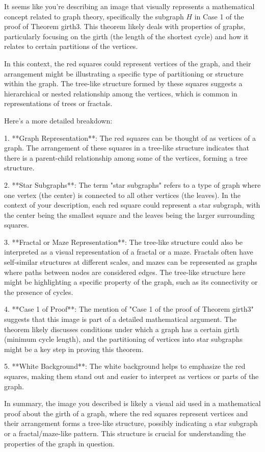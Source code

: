 It seems like you're describing an image that visually represents a mathematical concept related to graph theory, specifically the subgraph \(H\) in Case 1 of the proof of Theorem girth3. This theorem likely deals with properties of graphs, particularly focusing on the girth (the length of the shortest cycle) and how it relates to certain partitions of the vertices.

In this context, the red squares could represent vertices of the graph, and their arrangement might be illustrating a specific type of partitioning or structure within the graph. The tree-like structure formed by these squares suggests a hierarchical or nested relationship among the vertices, which is common in representations of trees or fractals.

Here's a more detailed breakdown:

1. **Graph Representation**: The red squares can be thought of as vertices of a graph. The arrangement of these squares in a tree-like structure indicates that there is a parent-child relationship among some of the vertices, forming a tree structure.
   
2. **Star Subgraphs**: The term "star subgraphs" refers to a type of graph where one vertex (the center) is connected to all other vertices (the leaves). In the context of your description, each red square could represent a star subgraph, with the center being the smallest square and the leaves being the larger surrounding squares.

3. **Fractal or Maze Representation**: The tree-like structure could also be interpreted as a visual representation of a fractal or a maze. Fractals often have self-similar structures at different scales, and mazes can be represented as graphs where paths between nodes are considered edges. The tree-like structure here might be highlighting a specific property of the graph, such as its connectivity or the presence of cycles.

4. **Case 1 of Proof**: The mention of "Case 1 of the proof of Theorem girth3" suggests that this image is part of a detailed mathematical argument. The theorem likely discusses conditions under which a graph has a certain girth (minimum cycle length), and the partitioning of vertices into star subgraphs might be a key step in proving this theorem.

5. **White Background**: The white background helps to emphasize the red squares, making them stand out and easier to interpret as vertices or parts of the graph.

In summary, the image you described is likely a visual aid used in a mathematical proof about the girth of a graph, where the red squares represent vertices and their arrangement forms a tree-like structure, possibly indicating a star subgraph or a fractal/maze-like pattern. This structure is crucial for understanding the properties of the graph in question.